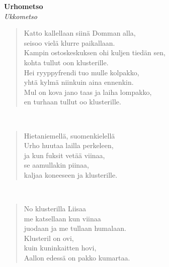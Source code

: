 %
%
\noindent\begin{minipage}{\linewidth}
\vspace{5pt}
\parbox[t]{0.85\linewidth}{\raggedright {\large\bf Urhometso}\\[2pt]\small\emph{Ukkometso}\\[6pt]}
\begin{verse}
	
	Katto kallellaan siinä Domman alla,\\
	seisoo vielä klurre paikallaan.\\
	Kampin ostoskeskuksen ohi kuljen tiedän sen,\\
	kohta tullut oon klusterille.\\
	Hei ryyppyfrendi tuo mulle kolpakko,\\
	yhtä kylmä niinkuin aina ennenkin.\\
	Mul on kova jano taas ja laiha lompakko,\\
	en turhaan tullut oo klusterille.\\
\end{verse}
\end{minipage}\\[10pt]
\noindent\begin{minipage}{\linewidth}
\begin{verse}
	Hietaniemellä, suomenkielellä\\
	Urho huutaa lailla perkeleen,\\
	ja kun fuksit vetää viinaa,\\
	se aamullakin piinaa,\\
	kaljaa koneeseen ja klusterille.\\
\end{verse}
\end{minipage}\\[10pt]
\noindent\begin{minipage}{\linewidth}
\begin{verse}
	No klusterilla Liisaa\\
	me katsellaan kun viinaa\\
	juodaan ja me tullaan humalaan.\\
	Klusteril on ovi,\\
	kuin kuninkaitten hovi,\\
	Aallon edessä on pakko kumartaa.\\
\end{verse}
\end{minipage}\\[10pt]
